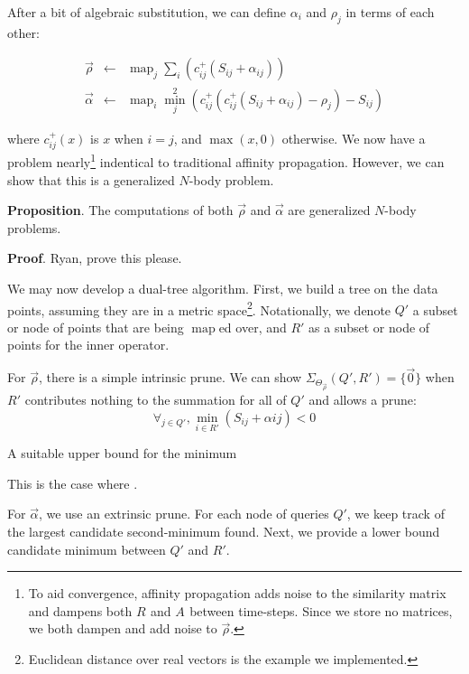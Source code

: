 \documentclass[times, 10pt]{article}
\DeclareMathOperator*{\map}{map}
\newcommand{\eqspace}{\!\!\!\!}
\newcommand{\cposij}{c^{+}_{ij}}
\newcommand{\respo}[2]{R_{#1#2}}
\newcommand{\avail}[2]{A_{#1#2}}
\newcommand{\simil}[2]{S_{#1#2}}
\newcommand{\vecrho}{\vec{\rho}}
\newcommand{\vecalpha}{\vec{\alpha}}
\newcommand{\frho}[1]{\rho_{#1}}
\newcommand{\falpha}[2]{\alpha_{#1#2}}
\begin{document}
\noindent 
After a bit of algebraic substitution, we can define $\falpha{i}{}$ and $\frho{j}$ in terms of each other:

\begin{eqnarray*}
  \vecrho \eqspace&\gets&\eqspace \map_{j} \sum_{i} \left( \cposij(\simil{i}{j} + \falpha{i}{j}) \right)
  \\
  \vecalpha \eqspace&\gets&\eqspace \map_{i} \min^2_{j} \left( \cposij(\cposij(\simil{i}{j} + \falpha{i}{j}) - \frho{j}) - \simil{i}{j} \right)
\end{eqnarray*}

\noindent where $\cposij(x)$ is $x$ when $i=j$, and $\max(x,0)$ otherwise.
We now have a problem nearly\footnote{To aid convergence, affinity propagation adds noise to the similarity matrix and dampens both $\respo{}{}$ and $\avail{}{}$ between time-steps.  Since we store no matrices, we both dampen and add noise to $\vecrho$.} indentical to traditional affinity propagation.
However, we can show that this is a generalized $N$-body problem.

{\bf Proposition}.
The computations of both $\vecrho$ and $\vecalpha$ are generalized $N$-body problems.

{\bf Proof}.
Ryan, prove this please.

We may now develop a dual-tree algorithm.
First, we build a tree on the data points, assuming they are in a metric space\footnote{Euclidean distance over real vectors is the example we implemented.}.
Notationally, we denote $Q'$ a subset or node of points that are being $\map$ed over, and $R'$ as a subset or node of points for the inner operator.

For $\vecrho$, there is a simple intrinsic prune.
We can show $\Sigma_{\Theta_{\vecrho}}(Q', R') = \{\vec{0}\}$ when $R'$ contributes nothing to the summation for all of $Q'$ and allows a prune:
$$\forall_{j \in Q'}, \min_{i \in R'} \left( \simil{i}{j} + \alpha{i}{j} \right) < 0$$

A suitable upper bound for the minimum

\noindent This is the case where .

For $\vecalpha$, we use an extrinsic prune.
For each node of queries $Q'$, we keep track of the largest candidate second-minimum found.
Next, we provide a lower bound candidate minimum between $Q'$ and $R'$.
\end{document}
